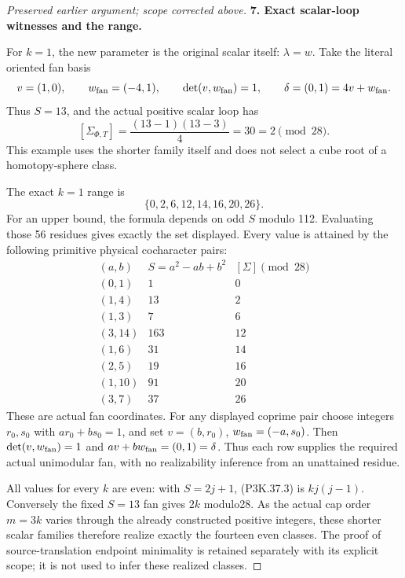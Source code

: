 \begin{proof}[Preserved earlier argument; scope corrected above]
\par\medskip\noindent\textbf{7. Exact scalar-loop witnesses and the range.}\enspace

For \(k=1\), the new parameter is the original scalar itself:
\(\lambda=w\). Take the literal oriented fan basis
\[
 v=(1,0),\qquad w_{\rm fan}=(-4,1),\qquad
 \det(v,w_{\rm fan})=1,\qquad \delta=(0,1)=4v+w_{\rm fan}.
\]
Thus \(S=13\), and the actual positive scalar loop has
\[
 [\Sigma_{\Phi,T}]=\frac{(13-1)(13-3)}4=30=2\pmod {28}.
\]
This example uses the shorter family itself and does not select a cube root
of a homotopy-sphere class.

The exact \(k=1\) range is
\[
                  \{0,2,6,12,14,16,20,26\}.                    \tag{P3K.37.15}
\]
For an upper bound, the formula depends on odd \(S\) modulo 112. Evaluating
those 56 residues gives exactly the set displayed. Every value is attained
by the following primitive physical cocharacter pairs:
\[
\begin{array}{c|r|r}
 (a,b)&S=a^2-ab+b^2&[\Sigma]\pmod {28}\\ \hline
 (0,1)&1&0\\
 (1,4)&13&2\\
 (1,3)&7&6\\
 (3,14)&163&12\\
 (1,6)&31&14\\
 (2,5)&19&16\\
 (1,10)&91&20\\
 (3,7)&37&26
\end{array}
\]
These are actual fan coordinates. For any displayed coprime pair choose
integers \(r_0,s_0\) with \(ar_0+bs_0=1\), and set
\(v=(b,r_0)\), \(w_{\rm fan}=(-a,s_0)\). Then
\(\det(v,w_{\rm fan})=1\) and \(av+bw_{\rm fan}=(0,1)=\delta\).
Thus each row supplies the required actual unimodular fan, with no
realizability inference from an unattained residue.

All values for every \(k\) are even: with \(S=2j+1\), (P3K.37.3) is
\(kj(j-1)\). Conversely the fixed \(S=13\) fan gives \(2k\) modulo28.
As the actual cap order \(m=3k\) varies through the already constructed
positive integers, these shorter scalar families therefore realize exactly
the fourteen even classes. The proof of source-translation endpoint
minimality is retained separately with its explicit scope; it is not used
to infer these realized classes.
\end{proof}
